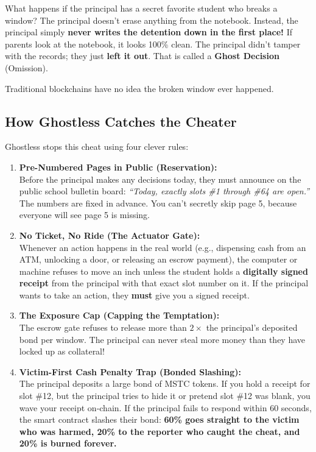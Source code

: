 \documentclass[11pt,a4paper]{article}
\begin{document}
What happens if the principal has a secret favorite student who breaks a window? 
The principal doesn't erase anything from the notebook. Instead, the principal simply \textbf{never writes the detention down in the first place!} 
If parents look at the notebook, it looks 100\% clean. The principal didn't tamper with the records; they just \textbf{left it out}. That is called a \textbf{Ghost Decision} (Omission).

Traditional blockchains have no idea the broken window ever happened.

\subsection{How Ghostless Catches the Cheater}
Ghostless stops this cheat using four clever rules:

\begin{enumerate}[leftmargin=1.5em]
    \item \textbf{Pre-Numbered Pages in Public (Reservation):}\\
    Before the principal makes any decisions today, they must announce on the public school bulletin board: \textit{``Today, exactly slots \#1 through \#64 are open.''} The numbers are fixed in advance. You can't secretly skip page 5, because everyone will see page 5 is missing.
    \item \textbf{No Ticket, No Ride (The Actuator Gate):}\\
    Whenever an action happens in the real world (e.g., dispensing cash from an ATM, unlocking a door, or releasing an escrow payment), the computer or machine refuses to move an inch unless the student holds a \textbf{digitally signed receipt} from the principal with that exact slot number on it. If the principal wants to take an action, they \textbf{must} give you a signed receipt.
    \item \textbf{The Exposure Cap (Capping the Temptation):}\\
    The escrow gate refuses to release more than $2\times$ the principal's deposited bond per window. The principal can never steal more money than they have locked up as collateral!
    \item \textbf{Victim-First Cash Penalty Trap (Bonded Slashing):}\\
    The principal deposits a large bond of MSTC tokens. If you hold a receipt for slot \#12, but the principal tries to hide it or pretend slot \#12 was blank, you wave your receipt on-chain. If the principal fails to respond within 60 seconds, the smart contract slashes their bond: \textbf{60\% goes straight to the victim who was harmed, 20\% to the reporter who caught the cheat, and 20\% is burned forever.}
\end{enumerate}
\end{document}
